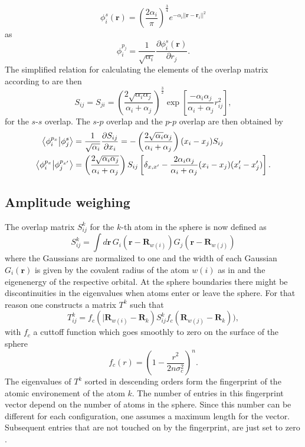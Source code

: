 $$\phi_i^s(\mathbf{r})=\left(\frac{2\alpha_i}{\pi}\right)^{\frac{3}{4}}e^{-\alpha_i||\mathbf{r}-\mathbf{r}_i||^2}$$
as
\begin{equation}\phi_i^{p_j}=\frac{1}{\sqrt{\alpha_i}}\frac{\partial\phi_i^s(\mathbf{r})}{\partial r_j}.\end{equation}
The simplified relation for calculating the elements of the overlap matrix according to \citeauthor{Clementi1966} \cite{Clementi1966} are then
\begin{equation}
\label{ovrlap}
S_{ij}=S_{ji}=\left(\frac{2\sqrt{\alpha_i\alpha_j}}{\alpha_i+\alpha_j}\right)^\frac{3}{2}\exp\left[\frac{-\alpha_i\alpha_j}{\alpha_i+\alpha_j}r_{ij}^2\right],\end{equation}
for the $s$-$s$ overlap. The $s$-$p$ overlap and the $p$-$p$ overlap are then obtained by
\begin{equation}
\begin{aligned}
\bra{\phi_i^{p_x}}\ket{\phi_j^s} &= \frac{1}{\sqrt{\alpha_i}}\frac{\partial S_{ij}}{\partial x_i}=-\left(\frac{2\sqrt{\alpha_i}\alpha_j}{\alpha_i+\alpha_j}\right)(x_i-x_j)S_{ij} \\
\bra{\phi_i^{p_x}}\ket{\phi_j^{p_{x'}}}&=\left(\frac{2\sqrt{\alpha_i\alpha_j}}{\alpha_i+\alpha_j}\right)S_{ij}\left[\delta_{x,x'}-\frac{2\alpha_i\alpha_j}{\alpha_i+\alpha_j}(x_i-x_j)(x'_i-x'_j)\right].
\end{aligned}
\end{equation}

\subsection{Amplitude weighing}
The overlap matrix $S^k_{ij}$ for the $k$-th atom in the sphere is now defined as
\begin{equation}S^k_{ij}=\int d\mathbf{r}\, G_i(\mathbf{r}-\mathbf{R}_{w(i)})G_j(\mathbf{r}-\mathbf{R}_{w(j)})\end{equation}
where the Gaussians are normalized to one and the width of each Gaussian $G_i(\mathbf{r})$ is given by the covalent radius of the atom $w(i)$ as in \cite{Zhu2016} and the eigenenergy of the respective orbital. At the sphere boundaries there might be discontinuities in the eigenvalues when atoms enter or leave the sphere. For that reason one constructs a matrix $T^k$ such that
\begin{equation}T^k_{ij}=f_c(|\mathbf{R}_{w(i)}-\mathbf{R}_k)S^k_{ij}f_c(\mathbf{R}_{w(j)}-\mathbf{R}_k)),\end{equation}
with $f_c$ a cuttoff function which goes smoothly to zero on the surface of the sphere
\begin{equation}f_c(r)=\left(1-\frac{r^2}{2n\sigma_c^2}\right)^n.\end{equation}
The eigenvalues of $T^k$ sorted in descending orders form the fingerprint of the atomic environement of the atom $k$. The number of entries in this fingerprint vector depend on the number of atoms in the sphere. Since this number can be different for each configuration, one assumes a maximum length for the vector. Subsequent entries that are not touched on by the fingerprint, are just set to zero \cite{Zhu2016}.
